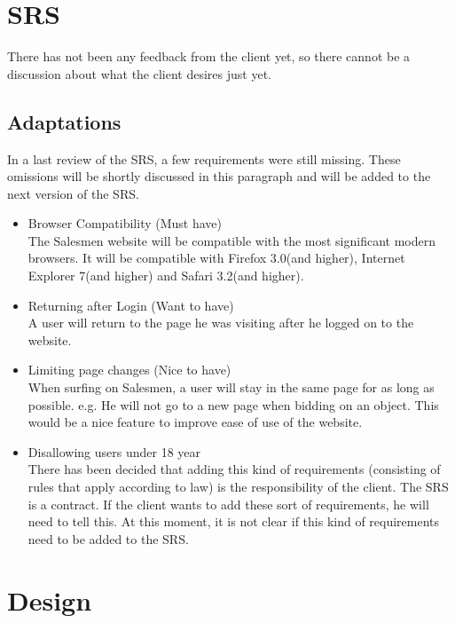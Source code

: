 \documentclass[a4paper, 12pt]{article}
\begin{document}
	\section{SRS}
There has not been any feedback from the client yet, so there cannot be a discussion about what the client desires just yet.
		\subsection{Adaptations}
In a last review of the SRS, a few requirements were still missing. These omissions will be shortly discussed in this paragraph and will be added to the next version of the SRS.
			\begin{itemize}
				\item Browser Compatibility (Must have)\\
The Salesmen website will be compatible with the most significant modern browsers. It will be compatible with Firefox 3.0(and higher), Internet Explorer 7(and higher) and Safari 3.2(and higher). 
				\item Returning after Login (Want to have) \\
A user will return to the page he was visiting after he logged on to the website. 
				\item Limiting page changes (Nice to have) \\
When surfing on Salesmen, a user will stay in the same page for as long as possible. e.g. He will not go to a new page when bidding on an object. This would be a nice feature to improve ease of use of the website.
				\item Disallowing users under 18 year \\
There has been decided that adding this kind of requirements (consisting of rules that apply according to law) is the responsibility of the client. The SRS is a contract. If the client wants to add these sort of requirements, he will need to tell this. At this moment, it is not clear if this kind of requirements need to be added to the SRS. 
			\end{itemize}

	\section{Design}
\end{document}
